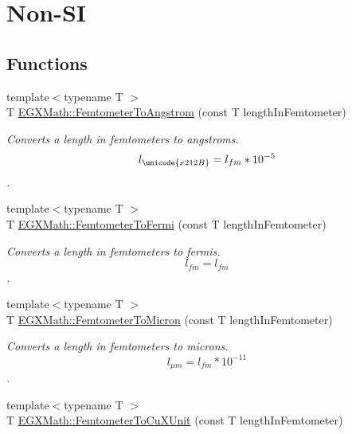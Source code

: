 \hypertarget{group___e_g_x_math-_conversions-_length_conversions-_femtometer-_non-_s_i}{}\section{Non-\/\+SI}
\label{group___e_g_x_math-_conversions-_length_conversions-_femtometer-_non-_s_i}
\subsection*{Functions}
\begin{DoxyCompactItemize}
\item 
{\footnotesize template$<$typename T $>$ }\\T \mbox{\hyperlink{group___e_g_x_math-_conversions-_length_conversions-_femtometer-_non-_s_i_ga72862654ebe3812db0fbf8d11d7059ff}{E\+G\+X\+Math\+::\+Femtometer\+To\+Angstrom}} (const T length\+In\+Femtometer)
\begin{DoxyCompactList}\small\item\em Converts a length in femtometers to angstroms. \[ l_{\unicode{x212B}}=l_{fm} * 10^{-5} \]. \end{DoxyCompactList}\item 
{\footnotesize template$<$typename T $>$ }\\T \mbox{\hyperlink{group___e_g_x_math-_conversions-_length_conversions-_femtometer-_non-_s_i_gaa2e838ef76ce47a3375291d76990b865}{E\+G\+X\+Math\+::\+Femtometer\+To\+Fermi}} (const T length\+In\+Femtometer)
\begin{DoxyCompactList}\small\item\em Converts a length in femtometers to fermis. \[ l_{fm}=l_{fm} \]. \end{DoxyCompactList}\item 
{\footnotesize template$<$typename T $>$ }\\T \mbox{\hyperlink{group___e_g_x_math-_conversions-_length_conversions-_femtometer-_non-_s_i_gac1a358bdb9bf33dec3cb847cafe1bc71}{E\+G\+X\+Math\+::\+Femtometer\+To\+Micron}} (const T length\+In\+Femtometer)
\begin{DoxyCompactList}\small\item\em Converts a length in femtometers to microns. \[ l_{\mu m}=l_{fm} * 10^{-11} \]. \end{DoxyCompactList}\item 
{\footnotesize template$<$typename T $>$ }\\T \mbox{\hyperlink{group___e_g_x_math-_conversions-_length_conversions-_femtometer-_non-_s_i_ga59bde341fe80506851e39cd2ceb3747b}{E\+G\+X\+Math\+::\+Femtometer\+To\+Cu\+X\+Unit}} (const T length\+In\+Femtometer)

\end{DoxyCompactItemize}

